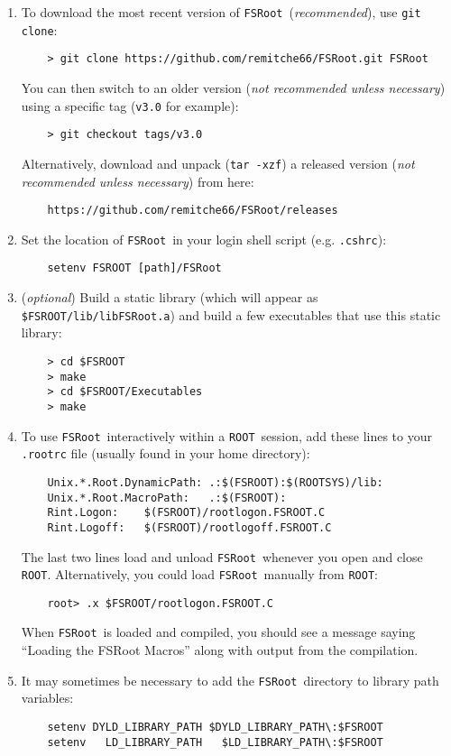 \documentclass[11pt]{article}
\newcommand{\FSR}{{\tt FSRoot}}
\newcommand{\ROOT}{{\tt ROOT}}
\begin{document}
\begin{enumerate}

\item To download the most recent version of \FSR\ ({\it recommended}), use {\tt git clone}:
\begin{verbatim}
    > git clone https://github.com/remitche66/FSRoot.git FSRoot
\end{verbatim}
You can then switch to an older version ({\it not recommended unless necessary})
using a specific tag ({\tt v3.0} for example):
\begin{verbatim}
    > git checkout tags/v3.0
\end{verbatim}
Alternatively, download and unpack ({\tt tar -xzf}) a released version ({\it not recommended unless necessary}) from here:
\begin{verbatim}
    https://github.com/remitche66/FSRoot/releases
\end{verbatim}


\item Set the location of \FSR\ in your login shell script (e.g. {\tt .cshrc}):
\begin{verbatim}
    setenv FSROOT [path]/FSRoot
\end{verbatim}

\item ({\it optional}) Build a static library (which will appear as {\tt \$FSROOT/lib/libFSRoot.a}) and build a few executables that use this static library:
\begin{verbatim}
    > cd $FSROOT
    > make
    > cd $FSROOT/Executables
    > make
\end{verbatim}
 

\item To use \FSR\ interactively within a \ROOT\ session, add these lines to your {\tt .rootrc} file (usually found in your home directory):
\begin{verbatim}
    Unix.*.Root.DynamicPath: .:$(FSROOT):$(ROOTSYS)/lib:
    Unix.*.Root.MacroPath:   .:$(FSROOT):
    Rint.Logon:    $(FSROOT)/rootlogon.FSROOT.C
    Rint.Logoff:   $(FSROOT)/rootlogoff.FSROOT.C
\end{verbatim}
The last two lines load and unload \FSR\ whenever you open and close \ROOT.
Alternatively, you could load \FSR\ manually from \ROOT:
\begin{verbatim}
    root> .x $FSROOT/rootlogon.FSROOT.C
\end{verbatim}
When \FSR\ is loaded and compiled, you should see a message saying ``Loading the FSRoot Macros'' along with output from the compilation.  

\item It may sometimes be necessary to add the \FSR\ directory to library path variables:
\begin{verbatim}
    setenv DYLD_LIBRARY_PATH $DYLD_LIBRARY_PATH\:$FSROOT
    setenv   LD_LIBRARY_PATH   $LD_LIBRARY_PATH\:$FSROOT
\end{verbatim}

\end{enumerate}
\end{document}
